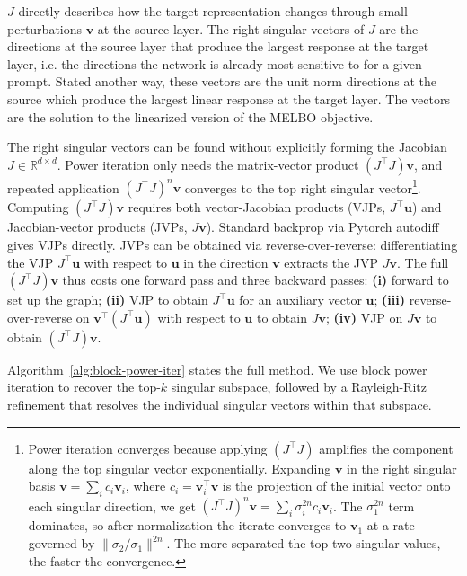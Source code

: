 \documentclass{article}
\begin{document}
$J$ directly describes how the target representation changes through small perturbations $\mathbf{v}$ at the source layer. The right singular vectors of $J$ are the directions at the source layer that produce the largest response at the target layer, i.e. the directions the network is already most sensitive to for a given prompt. Stated another way, these vectors are the unit norm directions at the source which produce the largest linear response at the target layer. The vectors are the solution to the linearized version of the MELBO objective.

The right singular vectors can be found without explicitly forming the Jacobian $J \in \mathbb{R}^{d \times d}$. Power iteration only needs the matrix-vector product $(J^\top J)\mathbf{v}$, and repeated application $(J^\top J)^n \mathbf{v}$ converges to the top right singular vector\footnote{Power iteration converges because applying $(J^\top J)$ amplifies the component along the top singular vector exponentially. Expanding $\mathbf{v}$ in the right singular basis $\mathbf{v} = \sum_i c_i \mathbf{v}_i$, where $c_i = \mathbf{v}_i^\top \mathbf{v}$ is the projection of the initial vector onto each singular direction, we get $(J^\top J)^n \mathbf{v} = \sum_i \sigma_i^{2n} c_i \mathbf{v}_i$. The $\sigma_1^{2n}$ term dominates, so after normalization the iterate converges to $\mathbf{v}_1$ at a rate governed by $\|\sigma_2 / \sigma_1\|^{2n}$. The more separated the top two singular values, the faster the convergence.}. Computing $(J^\top J)\mathbf{v}$ requires both vector-Jacobian products (VJPs, $J^\top \mathbf{u}$) and Jacobian-vector products (JVPs, $J\mathbf{v}$). Standard backprop via Pytorch autodiff gives VJPs directly. JVPs can be obtained via reverse-over-reverse: differentiating the VJP $J^\top \mathbf{u}$ with respect to $\mathbf{u}$ in the direction $\mathbf{v}$ extracts the JVP $J\mathbf{v}$. The full $(J^\top J)\mathbf{v}$ thus costs one forward pass and three backward passes: \textbf{(i)} forward to set up the graph; \textbf{(ii)} VJP to obtain $J^\top \mathbf{u}$ for an auxiliary vector $\mathbf{u}$; \textbf{(iii)} reverse-over-reverse on $\mathbf{v}^\top(J^\top \mathbf{u})$ with respect to $\mathbf{u}$ to obtain $J\mathbf{v}$; \textbf{(iv)} VJP on $J\mathbf{v}$ to obtain $(J^\top J)\mathbf{v}$.

Algorithm~\ref{alg:block-power-iter} states the full method. We use block power iteration to recover the top-$k$ singular subspace, followed by a Rayleigh-Ritz refinement that resolves the individual singular vectors within that subspace.
\end{document}

